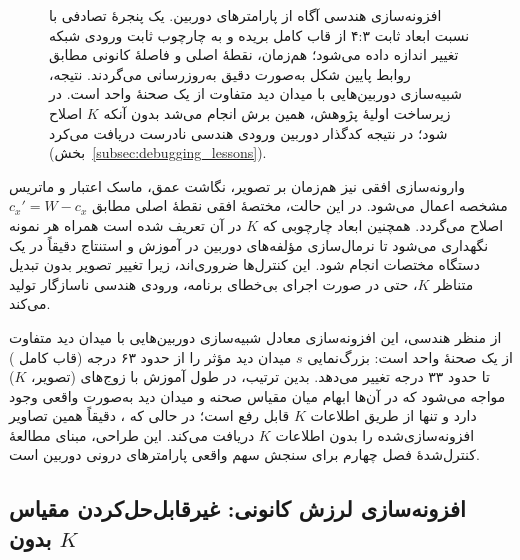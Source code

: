 \begin{figure}[htbp]
    \caption[افزونه‌سازی هندسی آگاه از پارامترهای دوربین]{افزونه‌سازی هندسی
    آگاه از پارامترهای دوربین. یک پنجرهٔ تصادفی با نسبت ابعاد ثابت ۴:۳ از قاب
    کامل بریده و به چارچوب ثابت ورودی شبکه تغییر اندازه داده می‌شود؛ هم‌زمان،
    نقطهٔ اصلی و فاصلهٔ کانونی مطابق روابط پایین شکل به‌صورت دقیق به‌روزرسانی
    می‌گردند. نتیجه، شبیه‌سازی دوربین‌هایی با میدان دید متفاوت از یک صحنهٔ
    واحد است. در زیرساخت اولیهٔ پژوهش، همین برش انجام می‌شد بدون آنکه $K$
    اصلاح شود؛ در نتیجه کدگذار دوربین ورودی هندسی نادرست دریافت می‌کرد
    (بخش~\ref{subsec:debugging_lessons}).}
    \label{fig:zoom_crop_aug}
\end{figure}

وارونه‌سازی افقی نیز هم‌زمان بر تصویر، نگاشت عمق، ماسک اعتبار و ماتریس مشخصه اعمال می‌شود. در این حالت، مختصهٔ افقی نقطهٔ اصلی مطابق $c_x'=W-c_x$ اصلاح می‌گردد. همچنین ابعاد چارچوبی که $K$ در آن تعریف شده است همراه هر نمونه نگهداری می‌شود تا نرمال‌سازی مؤلفه‌های دوربین در آموزش و استنتاج دقیقاً در یک دستگاه مختصات انجام شود. این کنترل‌ها ضروری‌اند، زیرا تغییر تصویر بدون تبدیل متناظر $K$، حتی در صورت اجرای بی‌خطای برنامه، ورودی هندسی ناسازگار تولید می‌کند.

از منظر هندسی، این افزونه‌سازی معادل شبیه‌سازی دوربین‌هایی با میدان دید متفاوت از یک صحنهٔ واحد است: بزرگ‌نمایی $s$ میدان دید مؤثر را از حدود ۶۳ درجه (قاب کامل ) تا حدود ۳۳ درجه تغییر می‌دهد. بدین ترتیب، \proposedmodel{} در طول آموزش با زوج‌های (تصویر، $K$) مواجه می‌شود که در آن‌ها ابهام میان مقیاس صحنه و میدان دید به‌صورت واقعی وجود دارد و تنها از طریق اطلاعات $K$ قابل رفع است؛ در حالی که \controlmodel{}، دقیقاً همین تصاویر افزونه‌سازی‌شده را بدون اطلاعات $K$ دریافت می‌کند. این طراحی، مبنای مطالعهٔ کنترل‌شدهٔ فصل چهارم برای سنجش سهم واقعی پارامترهای درونی دوربین است.

\subsection{افزونه‌سازی لرزش کانونی: غیرقابل‌حل‌کردن مقیاس بدون $K$}
\label{subsec:focal_jitter}


